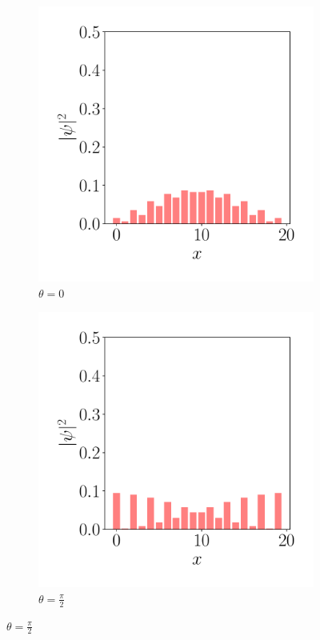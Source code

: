\begin{figure}[tbh!]
\begin{subfigure}[b!]{0.2 \textwidth}
    \end{subfigure}\hspace*{-0.9em}
    \begin{subfigure}[b!]{0.2 \textwidth}
        \caption*{$\theta=0$}
        \includegraphics[width=\textwidth]{Imagenes/Shh_images/proyection_2.pdf}
    \end{subfigure}\hspace*{-0.9em}
    \begin{subfigure}[b!]{0.2 \textwidth}
        \caption*{$\theta=\frac{\pi}{2}$}
        \includegraphics[width=\textwidth]{Imagenes/Shh_images/proyection_3.pdf}

\end{subfigure}
\end{figure}
